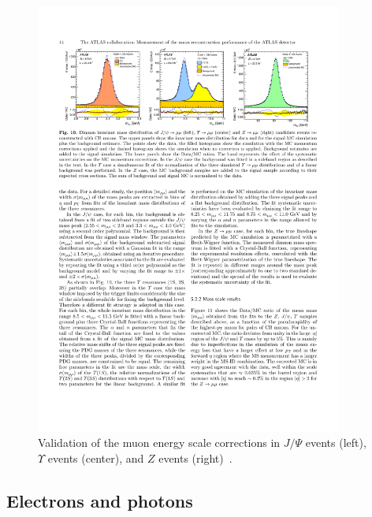 \begin{figure}[tp]
  \centering
  \includegraphics[width=0.90\textwidth]{figures/performance/muon-energyscale}
  \caption{Validation of the muon energy scale corrections in $J/\Psi$ events (left), $\Upsilon$ events (center), and $Z$ events (right)~\cite{PERF-2014-05}.}
  \label{fig:objects-muon-energyscale}
\end{figure}

\subsection{Electrons and photons}

